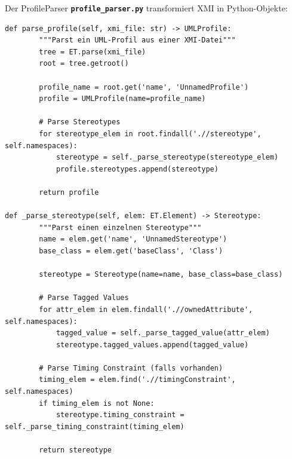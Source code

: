 ﻿\documentclass[a4paper,12pt]{report}
\theoremstyle{definition}
\begin{document}
Der ProfileParser  \texttt{\textbf{profile\_parser.py}} transformiert XMI in Python-Objekte:
\begin{lstlisting}[style=python, caption={ProfileParser Implementierung}, label={lst:profile-parser}]
def parse_profile(self, xmi_file: str) -> UMLProfile:
        """Parst ein UML-Profil aus einer XMI-Datei"""
        tree = ET.parse(xmi_file)
        root = tree.getroot()
        
        profile_name = root.get('name', 'UnnamedProfile')
        profile = UMLProfile(name=profile_name)
        
        # Parse Stereotypes
        for stereotype_elem in root.findall('.//stereotype', self.namespaces):
            stereotype = self._parse_stereotype(stereotype_elem)
            profile.stereotypes.append(stereotype)
        
        return profile
    
def _parse_stereotype(self, elem: ET.Element) -> Stereotype:
        """Parst einen einzelnen Stereotype"""
        name = elem.get('name', 'UnnamedStereotype')
        base_class = elem.get('baseClass', 'Class')
        
        stereotype = Stereotype(name=name, base_class=base_class)
        
        # Parse Tagged Values
        for attr_elem in elem.findall('.//ownedAttribute', self.namespaces):
            tagged_value = self._parse_tagged_value(attr_elem)
            stereotype.tagged_values.append(tagged_value)
        
        # Parse Timing Constraint (falls vorhanden)
        timing_elem = elem.find('.//timingConstraint', self.namespaces)
        if timing_elem is not None:
            stereotype.timing_constraint = self._parse_timing_constraint(timing_elem)
        
        return stereotype
\end{lstlisting}
\end{document}
